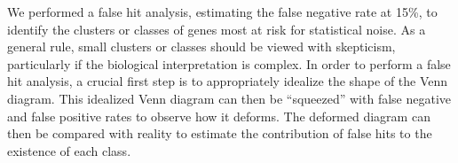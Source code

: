 \documentclass[10pt, twocolumn]{article}
\begin{document}
We performed a false hit analysis, estimating the false negative rate at 15\%,
to identify the clusters or classes of genes most at risk for statistical noise.
As a general rule, small clusters or classes should be viewed with skepticism,
particularly if the biological interpretation is complex. In order to perform
a false hit analysis, a crucial first step is to appropriately idealize the
shape of the Venn diagram. This idealized Venn diagram can then be ``squeezed''
with false negative and false positive rates to observe how it deforms. The
deformed diagram can then be compared with reality to estimate the contribution
of false hits to the existence of each class.


%
%
\end{document}
